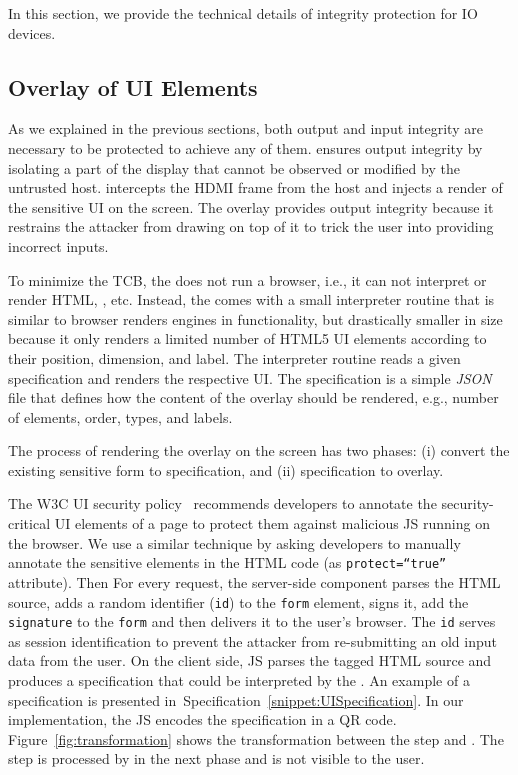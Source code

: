In this section, we provide the technical details of \name integrity protection for IO devices. 


\subsection{\device Overlay of UI Elements}
\label{sec:systemDesign:transformation}

As we explained in the previous sections, both output and input integrity are necessary to be protected to achieve any of them. \name ensures output integrity by isolating a part of the display that cannot be observed or modified by the untrusted host. \device intercepts the HDMI frame from the host and injects a render of the sensitive UI on the screen. The overlay provides output integrity because it restrains the attacker from drawing on top of it to trick the user into providing incorrect inputs. 

To minimize the TCB, the \device does not run a browser, i.e., it can not interpret or render HTML, \js, etc. Instead, the \device comes with a small interpreter routine that is similar to browser renders engines in functionality, but drastically smaller in size because it only renders a limited number of HTML5 UI elements according to their position, dimension, and label. The interpreter routine reads a given specification and renders the respective UI. The specification is a simple \emph{JSON} file that defines how the content of the overlay should be rendered, e.g., number of elements, order, types, and labels. 

The process of rendering the overlay on the screen has two phases: (i) convert the existing sensitive form to specification, and (ii) specification to overlay.

 The W3C UI security policy~\cite{w3c_spec} recommends developers to annotate the security-critical UI elements of a page to protect them against malicious JS running on the browser. We use a similar technique by asking developers to manually annotate the sensitive elements in the HTML code (as \texttt{protect=``true''} attribute). Then For every request, the \name server-side component parses the HTML source, adds a random identifier (\texttt{id}) to the \texttt{form} element, signs it, add the \texttt{signature} to the \texttt{form} and then delivers it to the user's browser. The \texttt{id} serves as session identification to prevent the attacker from re-submitting an old input data from the user. On the client side, \name JS parses the tagged HTML source and produces a specification that could be interpreted by the \device.  An example of a specification is presented in~Specification~\ref{snippet:UISpecification}. In our implementation, the \name JS encodes the specification in a QR code. Figure~\ref{fig:transformation} shows the transformation between the step \one and \two. The step \two is processed by \device in the next phase and is not visible to the user.


